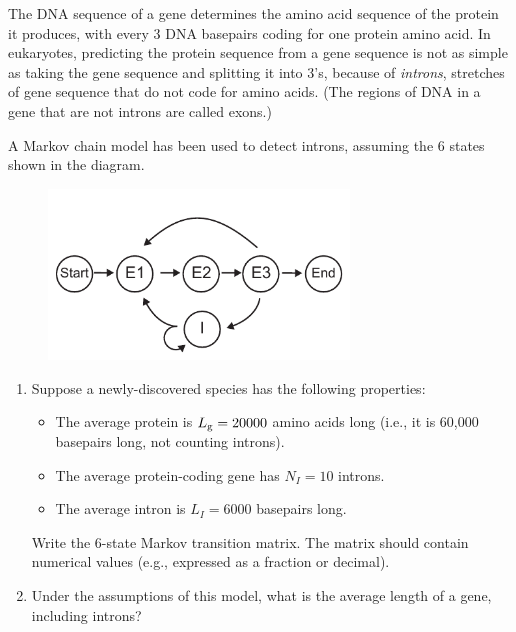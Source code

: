 \documentclass[12pt,letterpaper]{article}
\begin{document}


The DNA sequence of a gene determines the amino acid sequence of the protein it produces, with every 3 DNA basepairs coding for one protein amino acid. In eukaryotes, predicting the protein sequence from a gene sequence is not as simple as taking the gene sequence and splitting it into 3's, because of \emph{introns}, stretches of gene sequence that do not code for amino acids. (The regions of DNA in a gene that are not introns are called exons.)

A Markov chain model has been used to detect introns, assuming the 6 states shown in the diagram.
\begin{figure}[h!]
\centering\includegraphics[width=8cm]{figP21}
\end{figure}

\begin{enumerate}[i]
\item Suppose a newly-discovered species has the following properties:
\begin{itemize}
\item The average protein is $L_{\rm g} = 20000$ amino acids long (i.e., it is 60,000 basepairs long, not counting introns).
\item The average protein-coding gene has $N_I=10$ introns.
\item The average intron is $L_I=6000$ basepairs long. 
\end{itemize}
Write the 6-state Markov transition matrix. The matrix should contain numerical values (e.g., expressed as a fraction or decimal). 
\item Under the assumptions of this model, what is the average length of a gene, including introns?
\end{enumerate}

\end{document}
